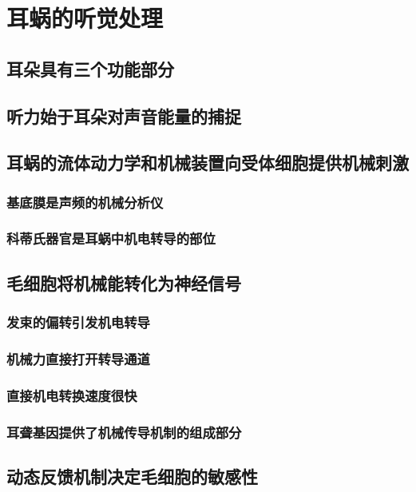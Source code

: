 \chapter{耳蜗的听觉处理}

\section{耳朵具有三个功能部分}

\section{听力始于耳朵对声音能量的捕捉}

\section{耳蜗的流体动力学和机械装置向受体细胞提供机械刺激}
\subsection{基底膜是声频的机械分析仪}
\subsection{科蒂氏器官是耳蜗中机电转导的部位}

\section{毛细胞将机械能转化为神经信号}
\subsection{发束的偏转引发机电转导}
\subsection{机械力直接打开转导通道}
\subsection{直接机电转换速度很快}
\subsection{耳聋基因提供了机械传导机制的组成部分}

\section{动态反馈机制决定毛细胞的敏感性}
